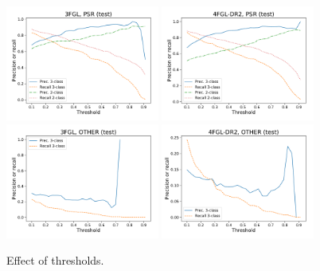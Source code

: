\begin{figure}[h]
\centering
\hspace*{-0.5cm}
\includegraphics[width=0.45\textwidth]{plots/thresholds/thresholds_prec_recall_3FGL_PSR.pdf}
\includegraphics[width=0.45\textwidth]{plots/thresholds/thresholds_prec_recall_4FGL-DR2_PSR.pdf} \\ 
\includegraphics[width=0.45\textwidth]{plots/thresholds/thresholds_prec_recall_3FGL_OTHER.pdf}
\includegraphics[width=0.45\textwidth]{plots/thresholds/thresholds_prec_recall_4FGL-DR2_OTHER.pdf}
\caption{Effect of thresholds.
}
\label{fig:thres}
\end{figure}
